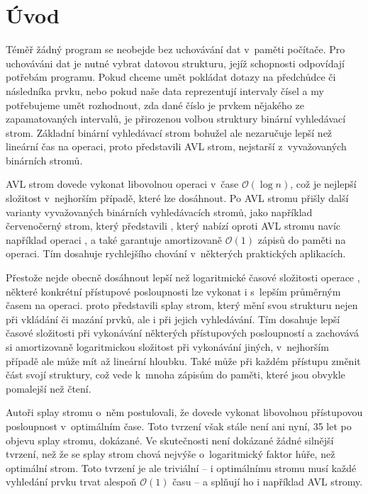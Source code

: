 \chapter*{Úvod}

Téměř žádný program se neobejde bez uchovávání dat v~paměti počítače. Pro uchováváni dat je nutné vybrat datovou strukturu, jejíž schopnosti odpovídají potřebám programu. Pokud chceme umět pokládat dotazy na předchůdce či následníka prvku, nebo pokud naše data reprezentují intervaly čísel a my potřebujeme umět rozhodnout, zda dané číslo je prvkem nějakého ze zapamatovaných intervalů, je přirozenou volbou struktury binární vyhledávací strom. Základní binární vyhledávací strom bohužel ale nezaručuje lepší než lineární čas na operaci, proto \citet{AVL} představili AVL strom, nejstarší z~vyvažovaných binárních stromů.

AVL strom dovede vykonat libovolnou operaci v~čase $\mathcal O(\log n)$, což je nejlepší složitost v~nejhorším případě, které lze dosáhnout. Po AVL stromu přišly další varianty vyvažovaných binárních vyhledávacích stromů, jako například červenočerný strom, který představili \citet{redblack}, který nabízí oproti AVL stromu navíc například operaci , a také garantuje amortizovaně $\mathcal O(1)$ zápisů do paměti na operaci. Tím dosahuje rychlejšího chování v~některých praktických aplikacích. 

Přestože nejde obecně dosáhnout lepší než logaritmické časové složitosti operace , některé konkrétní přístupové posloupnosti lze vykonat i s~lepším průměrným časem na operaci. \citet{splay} proto představili splay strom, který mění svou strukturu nejen při vkládání či mazání prvků, ale i při jejich vyhledávání. Tím dosahuje lepší časové složitosti při vykonávání některých přístupových posloupností a zachovává si amortizovaně logaritmickou složitost při vykonávání jiných, v~nejhorším případě ale může mít až lineární hloubku. Také může při každém přístupu změnit část svojí struktury, což vede k~mnoha zápisům do paměti, které jsou obvykle pomalejší než čtení.

Autoři splay stromu o~něm postulovali, že dovede vykonat libovolnou přístupovou posloupnost v~optimálním čase. Toto tvrzení však stále není ani nyní, 35 let po objevu splay stromu, dokázané. Ve skutečnosti není dokázané žádné silnější tvrzení, než že se splay strom chová nejvýše o~logaritmický faktor hůře, než optimální strom. Toto tvrzení je ale triviální -- i optimálnímu stromu musí každé vyhledání prvku trvat alespoň $\mathcal O(1)$ času -- a splňují ho i například AVL stromy.


